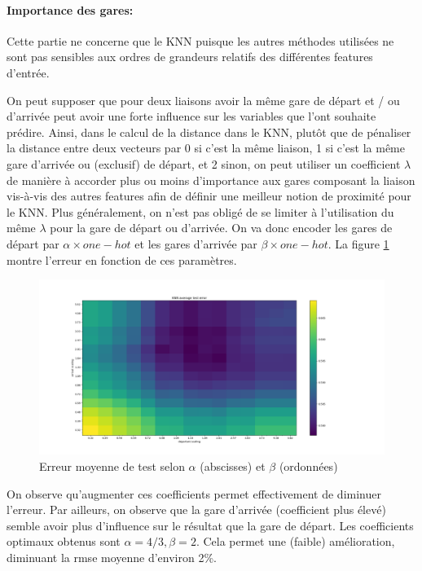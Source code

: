 \documentclass{article}
\begin{document}
\paragraph{Importance des gares:}
Cette partie ne concerne que le KNN puisque les autres méthodes utilisées ne sont pas sensibles aux ordres de grandeurs relatifs des différentes features d'entrée. 

On peut supposer que pour deux liaisons avoir la même gare de départ et / ou d'arrivée peut avoir une forte influence sur les variables que l'ont souhaite prédire. Ainsi, dans le calcul de la distance dans le KNN, plutôt que de pénaliser la distance entre deux vecteurs par 0 si c'est la même liaison, 1 si c'est la même gare d'arrivée ou (exclusif) de départ, et 2 sinon, on peut utiliser un coefficient $\lambda$ de manière à accorder plus ou moins d'importance aux gares composant la liaison vis-à-vis des autres features afin de définir une meilleur notion de proximité pour le KNN. Plus généralement, on n'est pas obligé de se limiter à l'utilisation du même $\lambda$ pour la gare de départ ou d'arrivée. On va donc encoder les gares de départ par $\alpha \times one-hot$ et les gares d'arrivée par $\beta \times one-hot$. La figure \ref{erreur_a_b} montre l'erreur en fonction de ces paramètres.

\begin{figure}[H]
    \centering
    \includegraphics[scale=0.35]{station_scaling.png}
    \caption{Erreur moyenne de test selon $\alpha$ (abscisses) et $\beta$ (ordonnées)}
    \label{erreur_a_b}
\end{figure}

On observe qu'augmenter ces coefficients permet effectivement de diminuer l'erreur. Par ailleurs, on observe que la gare d'arrivée (coefficient plus élevé) semble avoir plus d'influence sur le résultat que la gare de départ. Les coefficients optimaux obtenus sont $\alpha = 4/3, \beta=2$. Cela permet une (faible) amélioration, diminuant la rmse moyenne d'environ 2\%.
\end{document}
